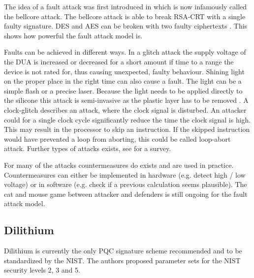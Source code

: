 \documentclass[a4paper,titlepage]{article}
\begin{document}
The idea of a fault attack was first introduced in \cite{bellcore} which is now infamously called the bellcore attack. The bellcore attack is able to break RSA-CRT with a single faulty signature. DES and AES can be broken with two faulty ciphertexts \cite{fault_survey}. This shows how powerful the fault attack model is.

Faults can be achieved in different ways. In a glitch attack the supply voltage of the DUA is increased or decreased for a short amount if time to a range the device is not rated for, thus causing unexpected, faulty behaviour.
Shining light on the proper place in the right time can also cause a fault. The light can be a simple flash or a precise laser. Because the light needs to be applied directly to the silicone this attack is semi-invasive as the plastic layer has to be removed \cite{older_fault_survey}.
A clock-glitch describes an attack, where the clock signal is disturbed. An attacker could for a single clock cycle significantly reduce the time the clock signal is high. This may result in the processor to skip an instruction. If the skipped instruction would have prevented a loop from aborting, this could be called loop-abort attack.   
Further types of attacks exists, see \cite{fault_survey} for a survey.

For many of the attacks countermeasures do exists and are used in practice. Countermeasures can either be implemented in hardware (e.g. detect high / low voltage) or in software (e.g. check if a previous calculation seems plausible).
 The cat and mouse game between attacker and defenders is still ongoing for the fault attack model.

\subsection{Dilithium}
\label{sec:explaindilith}
Dilithium is currently the only PQC signature scheme recommended and to be standardized by the NIST. \cite{niststatus} The authors proposed parameter sets for the NIST security levels 2, 3 and 5.
\end{document}
